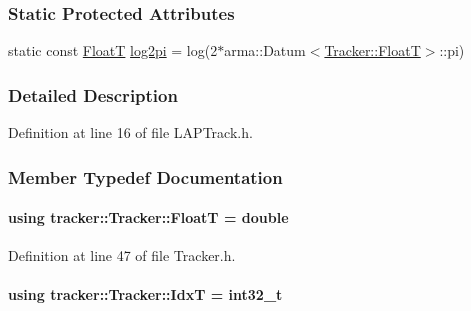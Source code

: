 \subsubsection*{Static Protected Attributes}
\begin{DoxyCompactItemize}
\item 
static const \hyperlink{classtracker_1_1Tracker_a66e8a81f12871e23082264c964f8f103}{FloatT} \hyperlink{classtracker_1_1Tracker_adf40b4f798f070419f5eb697b36b65ac}{log2pi} = log(2$\ast$arma\+::\+Datum$<$\hyperlink{classtracker_1_1Tracker_a66e8a81f12871e23082264c964f8f103}{Tracker\+::\+FloatT}$>$\+::pi)
\end{DoxyCompactItemize}


\subsubsection{Detailed Description}


Definition at line 16 of file L\+A\+P\+Track.\+h.



\subsubsection{Member Typedef Documentation}
\paragraph[{\texorpdfstring{FloatT}{FloatT}}]{\setlength{\rightskip}{0pt plus 5cm}using {\bf tracker\+::\+Tracker\+::\+FloatT} =  double\hspace{0.3cm}{\ttfamily [inherited]}}\hypertarget{classtracker_1_1Tracker_a66e8a81f12871e23082264c964f8f103}{}\label{classtracker_1_1Tracker_a66e8a81f12871e23082264c964f8f103}


Definition at line 47 of file Tracker.\+h.

\paragraph[{\texorpdfstring{IdxT}{IdxT}}]{\setlength{\rightskip}{0pt plus 5cm}using {\bf tracker\+::\+Tracker\+::\+IdxT} =  int32\+\_\+t\hspace{0.3cm}{\ttfamily [inherited]}}\hypertarget{classtracker_1_1Tracker_ad39a875dc6957cb6a9f3affcf6517d80}{}\label{classtracker_1_1Tracker_ad39a875dc6957cb6a9f3affcf6517d80}


